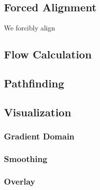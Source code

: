 \subsection{Forced Alignment}
We forcibly align

\subsection{Flow Calculation}

\subsection{Pathfinding}

\subsection{Visualization}

\subsubsection{Gradient Domain}

\subsubsection{Smoothing}

\subsubsection{Overlay}
